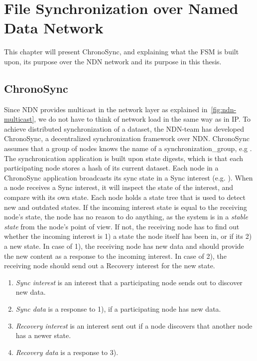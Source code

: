 \chapter{File Synchronization over Named Data Network}\label{chp3:file-sync}
This chapter will present ChronoSync, and explaining what the \gls{FSM} is built upon, its purpose over the \gls{NDN} network and its purpose in this thesis. 

\section{ChronoSync}\label{chronosync}
Since \gls{NDN} provides multicast in the network layer as explained in~\autoref{fig:ndn-multicast}, we do not have to think of network load in the same way as in \gls{IP}.  
To achieve distributed synchronization of a \gls{data}set, the \gls{NDN}-team has developed ChronoSync, a decentralized synchronization framework over \gls{NDN}. 
ChronoSync assumes that a group of nodes knows the \gls{name} of a \gls{synchronization_group}, e.g .
The synchronication application is built upon state digests, which is that each participating node stores a hash of its current \gls{data}set. 
Each node in a ChronoSync application broadcasts its sync state in a Sync \gls{interest} (e.g. ).
When a node receives a Sync \gls{interest}, it will inspect the state of the \gls{interest}, and compare with its own state.
Each node holds a state tree that is used to detect new and outdated states.
If the incoming \gls{interest} state is equal to the receiving node's state, the node has no reason to do anything, as the system is in a \textit{stable state} from the node's point of view.
If not, the receiving node has to find out whether the incoming \gls{interest} is 1) a state the node itself has been in, or if its 2) a new state.
In case of 1), the receiving node has new \gls{data} and should provide the new content as a response to the incoming \gls{interest}. In case of 2), the receiving node should send out a Recovery \gls{interest} for the new state.

\begin{enumerate}
  \item \textit{Sync \gls{interest}} is an \gls{interest} that a participating node sends out to discover new \gls{data}.
  \item \textit{Sync \gls{data}} is a response to 1), if a participating node has new \gls{data}.
  \item \textit{Recovery \gls{interest}} is an \gls{interest} sent out if a node discovers that another node has a newer state.
  \item \textit{Recovery \gls{data}} is a response to 3).
\end{enumerate}

